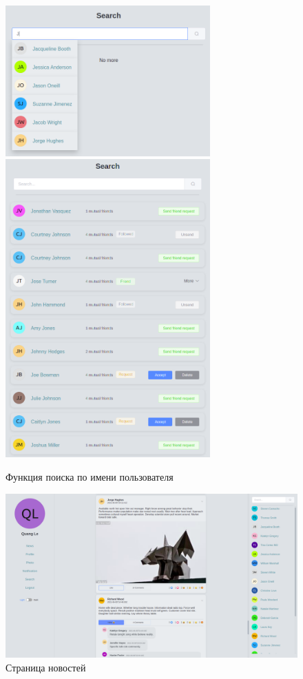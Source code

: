 \begin{figure}[H]
    \centering
    \includegraphics[width=0.7\textwidth]{img/search1.png}
    \includegraphics[width=0.7\textwidth]{img/search2.png}
    \caption{Функция поиска по имени пользователя}
\end{figure}

\begin{figure}[H]
    \centering
    \includegraphics[width=\textwidth]{img/feed.png}
    \caption{Страница новостей}
\end{figure}

